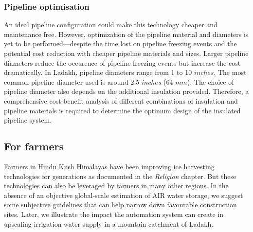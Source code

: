 \subsubsection{Pipeline optimisation}

An ideal pipeline configuration could make this technology cheaper and maintenance free. However, optimization
of the pipeline material and diameters is yet to be performed---despite the time lost on pipeline freezing
events and the potential cost reduction with cheaper pipeline materials and sizes. Larger pipeline diameters
reduce the occurence of pipeline freezing events but increase the cost dramatically. In Ladakh, pipeline
diameters range from 1 to 10 $inches$. The most common pipeline diameter used is around 2.5 $inches$ (64 $mm$).
The choice of pipeline diameter also depends on the additional insulation provided. Therefore, a comprehensive
cost-benefit analysis of different combinations of insulation and pipeline materials is required to determine
the optimum design of the insulated pipeline system.  




\subsection{For farmers}

Farmers in Hindu Kush Himalayas have been improving ice harvesting technologies for generations as documented in
the \textit{Religion} chapter. But these technologies can also be leveraged by farmers in many other regions. In
the absence of an objective global-scale estimation of AIR water storage, we suggest some subjective guidelines
that can help narrow down favourable construction sites. Later, we illustrate the impact the automation system
can create in upscaling irrigation water supply in a mountain catchment of Ladakh.

